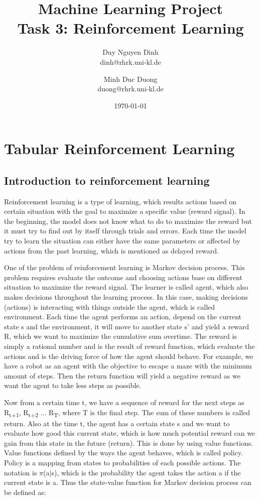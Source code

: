 \documentclass[11pt]{article}
\title{Machine Learning Project\\Task 3: Reinforcement Learning}
\author{Duy Nguyen Dinh \\ dinh@rhrk.uni-kl.de\and
	Minh Duc Duong\\ duong@rhrk.uni-kl.de\and
}
\date{\today}
\begin{document}
\maketitle

\section{Tabular Reinforcement Learning}

\subsection{Introduction to reinforcement learning}
Reinforcement learning is a type of learning, which results actions based on certain situation with the goal to maximize a specific value (reward signal). In the beginning, the model does not know what to do to maximize the reward but it must try to find out by itself through trials and errors. Each time the model try to learn the situation can either have the same parameters or affected by actions from the past learning, which is mentioned as delayed reward.

One of the problem of reinforcement learning is Markov decision process. This problem requires evaluate the outcome and choosing actions base on different situation to maximize the reward signal. The learner is called agent, which also makes decisions throughout the learning process. In this case, making decisions (actions) is interacting with things outside the agent, which is called environment. Each time the agent performs an action, depend on the current state s and the environment, it will move to another state s' and yield a reward R, which we want to maximize the cumulative sum overtime. The reward is simply a rational number and is the result of reward function, which evaluate the actions and is the driving force of how the agent should behave. For example, we have a robot as an agent with the objective to escape a maze with the minimum amount of steps. Then the return function will yield a negative reward as we want the agent to take less steps as possible.

Now from a certain time t, we have a sequence of reward for the next steps as R\textsubscript{t+1},  R\textsubscript{t+2} ... R\textsubscript{T}, where T is the final step. The sum of these numbers is called return. Also at the time t, the agent has a certain state s and we want to evaluate how good this current state, which is how much potential reward can we gain from this state in the future (return). This is done by using value functions. Value functions defined by the ways the agent behaves, which is called policy. Policy is a mapping from states to probabilities of each possible actions. The notation is $\pi$(a$\vert$s), which is the probability the agent takes the action a if the current state is a. Thus the state-value function for Markov decision process can be defined as:
\end{document}
